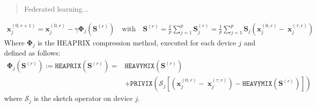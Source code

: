 \documentclass[article]{article}
\begin{document}
\begin{abstract}
Federated learning... 
\end{abstract}

\begin{align}
\boldsymbol{x}_j^{(0,r+1)}=\boldsymbol{x}_j^{(0,r)}-\gamma{\mathbf{\Phi}_j}\left({\mathbf{S}}^{(r)}\right) \quad \textrm{with} \quad {\mathbf{S}}^{(r)}=\frac{1}{p}\sum_{j=1}^p \mathbf{S}^{(r)}_{j} = \frac{1}{p}\sum_{j=1}^p \mathbf{S}_{j}\left(\boldsymbol{x}_j^{(0,r)}-~{\boldsymbol{x}}_{j}^{(\tau,r)}\right)
\end{align}
Where $\mathbf{\Phi}_j$ is the HEAPRIX compression method, executed for each device $j$ and defined as follows:
\begin{equation}
\begin{split}
   \mathbf{\Phi}_j(\mathbf{S}^{(r)}) :=  \texttt{HEAPRIX}(\mathbf{S}^{(r)})=& \texttt{HEAVYMIX}\left(\mathbf{S}^{(r)}\right)\\
   & +\texttt{PRIVIX}\left(\mathcal{S}_j \left[\left(\boldsymbol{x}_j^{(0,r)}-~{\boldsymbol{x}}_{j}^{(\tau,r)}\right)-\texttt{HEAVYMIX}\left(\mathbf{S}^{(r)}\right)  \right] \right)
\end{split}
\end{equation}
where $\mathcal{S}_j$ is the sketch operator on device $j$.





\newpage


\newpage
\appendix

\end{document}
